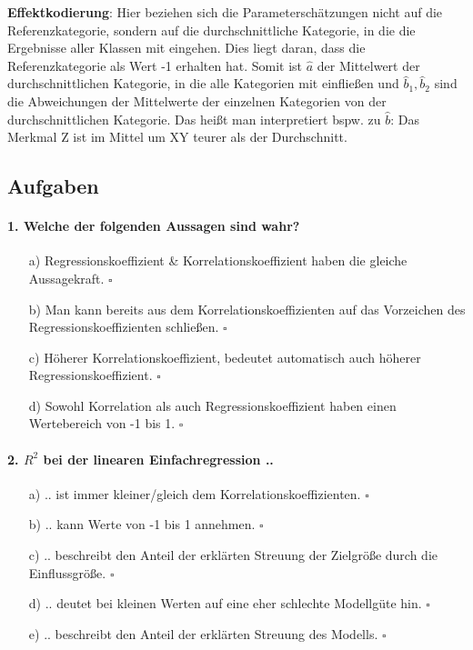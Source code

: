 \documentclass[a4paper]{article}
\begin{document}
\textbf{Effektkodierung}: Hier beziehen sich die Parameterschätzungen nicht auf die Referenzkategorie, sondern auf die durchschnittliche Kategorie, in die die Ergebnisse aller Klassen  mit eingehen. Dies liegt daran, dass die Referenzkategorie als Wert -1 erhalten hat.
Somit ist $\hat{a}$ der Mittelwert der durchschnittlichen Kategorie, in die alle Kategorien mit einfließen und $\hat{b}_1,\hat{b}_2$ sind die Abweichungen der Mittelwerte der einzelnen Kategorien von der durchschnittlichen Kategorie. Das heißt man interpretiert bspw. zu $\hat{b}$: Das Merkmal Z ist im Mittel um XY teurer als der Durchschnitt.

\clearpage

\subsection{Aufgaben}

\paragraph{1. Welche der folgenden Aussagen sind wahr?}

\begin{itemize}
    \item[a)] Regressionskoeffizient \& Korrelationskoeffizient haben die gleiche Aussagekraft. \hfill $\square$
    \item[b)] Man kann bereits aus dem Korrelationskoeffizienten auf das Vorzeichen des\\Regressionskoeffizienten schließen. \hfill $\square$
    \item[c)] Höherer Korrelationskoeffizient, bedeutet automatisch auch höherer\\Regressionskoeffizient. \hfill $\square$
    \item[d)] Sowohl Korrelation als auch Regressionskoeffizient haben einen Wertebereich von -1 bis 1. \hfill $\square$
\end{itemize}

\paragraph{2. $R^2$ bei der linearen Einfachregression ..}

\begin{itemize}
    \item[a)] .. ist immer kleiner/gleich dem Korrelationskoeffizienten. \hfill $\square$
    \item[b)] .. kann Werte von -1 bis 1 annehmen. \hfill $\square$
    \item[c)] .. beschreibt den Anteil der erklärten Streuung der Zielgröße durch die Einflussgröße. \hfill $\square$
    \item[d)] .. deutet bei kleinen Werten auf eine eher schlechte Modellgüte hin. \hfill $\square$
    \item[e)] .. beschreibt den Anteil der erklärten Streuung des Modells. \hfill $\square$
\end{itemize}
\end{document}
